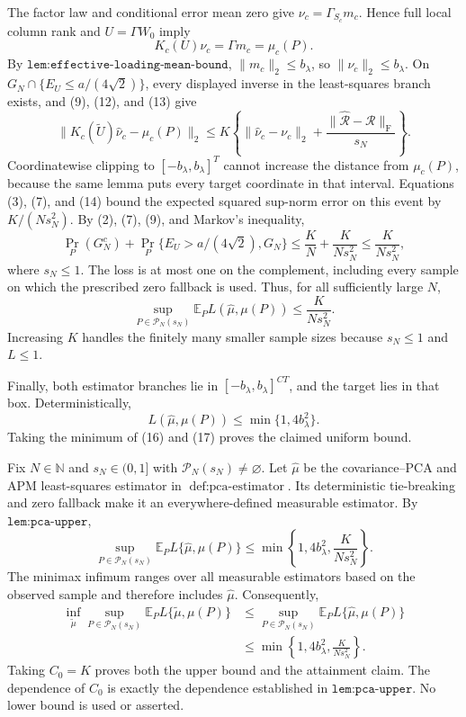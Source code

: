 The factor law and conditional error mean zero give \(\nu_c=\Gamma_{S_c}m_c\). Hence full local column rank and \(U=\Gamma W_0\) imply
\[
K_c(U)\nu_c=\Gamma m_c=\mu_c(P).
\tag{13}
\]
By \(\texttt{lem:effective-loading-mean-bound}\), \(\|m_c\|_2\leq b_\lambda\), so \(\|\nu_c\|_2\leq b_\lambda\). On \(G_N\cap\{E_U\leq a/(4\sqrt2)\}\), every displayed inverse in the least-squares branch exists, and (9), (12), and (13) give
\[
\|K_c(\widetilde U)\widehat\nu_c-\mu_c(P)\|_2
\leq K\left\{\|\widehat\nu_c-\nu_c\|_2
+\frac{\|\widehat{\mathcal R}-\mathcal R\|_{\mathrm F}}{s_N}\right\}.
\tag{14}
\]
Coordinatewise clipping to \([-b_\lambda,b_\lambda]^T\) cannot increase the distance from \(\mu_c(P)\), because the same lemma puts every target coordinate in that interval. Equations (3), (7), and (14) bound the expected squared sup-norm error on this event by \(K/(Ns_N^2)\). By (2), (7), (9), and Markov's inequality,
\[
\Pr_P(G_N^c)+\Pr_P\{E_U>a/(4\sqrt2),G_N\}
\leq\frac K N+\frac{K}{Ns_N^2}
\leq\frac{K}{Ns_N^2},
\tag{15}
\]
where \(s_N\leq1\). The loss is at most one on the complement, including every sample on which the prescribed zero fallback is used. Thus, for all sufficiently large \(N\),
\[
\sup_{P\in\mathcal P_N(s_N)}
\mathbb E_PL(\widehat\mu,\mu(P))
\leq\frac{K}{Ns_N^2}.
\tag{16}
\]
Increasing \(K\) handles the finitely many smaller sample sizes because \(s_N\leq1\) and \(L\leq1\).

Finally, both estimator branches lie in \([-b_\lambda,b_\lambda]^{CT}\), and the target lies in that box. Deterministically,
\[
L(\widehat\mu,\mu(P))\leq\min\{1,4b_\lambda^2\}.
\tag{17}
\]
Taking the minimum of (16) and (17) proves the claimed uniform bound.

Fix \(N\in\mathbb N\) and \(s_N\in(0,1]\) with \(\mathcal P_N(s_N)\neq\varnothing\). Let \(\widehat\mu\) be the covariance--PCA and APM least-squares estimator in \(\operatorname{def:pca\text{-}estimator}\). Its deterministic tie-breaking and zero fallback make it an everywhere-defined measurable estimator. By \(\texttt{lem:pca-upper}\),
\[
\sup_{P\in\mathcal P_N(s_N)}
\mathbb E_PL\{\widehat\mu,\mu(P)\}
\leq\min\!\left\{1,4b_\lambda^2,\frac{K}{Ns_N^2}\right\}.
\tag{1}
\]
The minimax infimum ranges over all measurable estimators based on the observed sample and therefore includes \(\widehat\mu\). Consequently,
\[
\begin{aligned}
\inf_{\widetilde\mu}\sup_{P\in\mathcal P_N(s_N)}
\mathbb E_PL\{\widetilde\mu,\mu(P)\}
&\leq\sup_{P\in\mathcal P_N(s_N)}
\mathbb E_PL\{\widehat\mu,\mu(P)\}\\
&\leq\min\!\left\{1,4b_\lambda^2,\frac{K}{Ns_N^2}\right\}.
\end{aligned}
\]
Taking \(C_0=K\) proves both the upper bound and the attainment claim. The dependence of \(C_0\) is exactly the dependence established in \(\texttt{lem:pca-upper}\). No lower bound is used or asserted.


